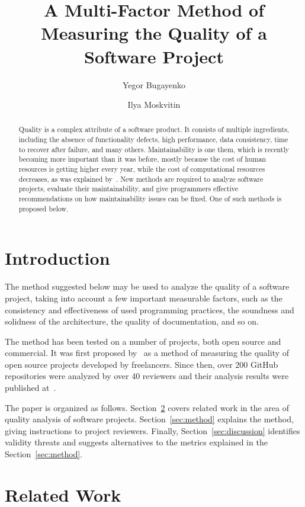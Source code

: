 \documentclass[manuscript,12pt,nonacm=true,oneside]{acmart}
\title{A Multi-Factor Method of Measuring the Quality of a Software Project}
\author{Yegor Bugayenko}
\author{Ilya Moskvitin}
\begin{document}
\setlength{\topskip}{6pt}
\setlength{\parindent}{0pt} %
\setlength{\parskip}{6pt} %

\begin{abstract}
Quality is a complex attribute of a software product. It consists of
multiple ingredients, including the absence of functionality defects,
high performance, data consistency, time to recover after failure, and
many others. Maintainability is one them, which is recently becoming
more important than it was before, mostly because the cost of
human resources is getting higher every year, while the cost of
computational resources decreases, as was explained by~\citet{yb-hacking}.
New methods are required to analyze software projects, evaluate their
maintainability, and give programmers effective recommendations on
how maintainability issues can be fixed. One of such methods is proposed
below.
\end{abstract}
\maketitle

\section{Introduction}

The method suggested below may be used to analyze the quality
of a software project, taking into account a few important
measurable factors, such as the consistency and effectiveness of
used programming practices, the soundness and solidness of the
architecture, the quality of documentation, and so on.

The method has been tested on a number of projects, both
open source and commercial. It was first proposed by~\citet{yb-sins}
as a method of measuring the quality of open source projects developed
by freelancers. Since then, over 200 GitHub repositories were
analyzed by over 40 reviewers and their analysis results were published
at~\citep{yb-award}.

The paper is organized as follows.
Section~\ref{sec:related} covers related work in the area of quality analysis
of software projects.
Section~\ref{sec:method} explains the method, giving instructions
to project reviewers.
Finally, Section~\ref{sec:discussion} identifies validity threats and suggests
alternatives to the metrics explained in the Section~\ref{sec:method}.

\section{Related Work}
\label{sec:related}
\end{document}
